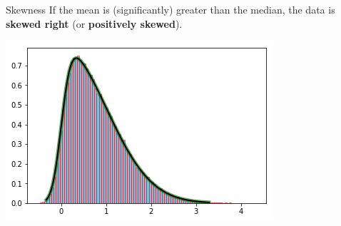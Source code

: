 \documentclass[t]{beamer}
\begin{document}
\begin{frame}{Skewness}
If the mean is (significantly) greater than the median, the data is \textbf{skewed right} (or \textbf{positively skewed}).
\begin{center}
\includegraphics[scale=0.5]{../Images/right_skewed.png}
\end{center}
\end{frame}
\end{document}
